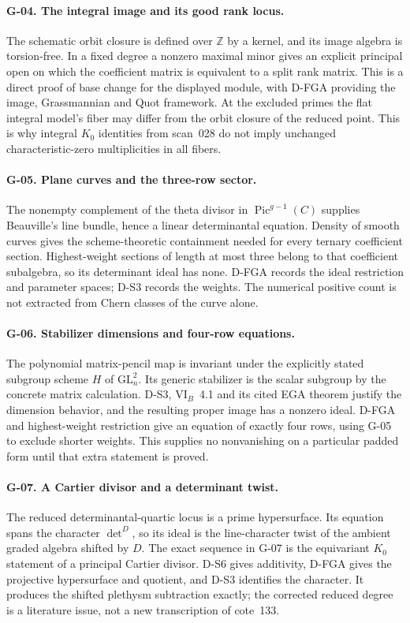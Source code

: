 \paragraph{G-04. The integral image and its good rank locus.}
The schematic orbit closure is defined over $\mathbb Z$ by a kernel, and its image algebra is torsion-free. In a fixed degree a nonzero maximal minor gives an explicit principal open on which the coefficient matrix is equivalent to a split rank matrix. This is a direct proof of base change for the displayed module, with D-FGA providing the image, Grassmannian and Quot framework. At the excluded primes the flat integral model's fiber may differ from the orbit closure of the reduced point. This is why integral $K_0$ identities from scan~028 do not imply unchanged characteristic-zero multiplicities in all fibers.

\paragraph{G-05. Plane curves and the three-row sector.}
The nonempty complement of the theta divisor in $\operatorname{Pic}^{g-1}(C)$ supplies Beauville's line bundle, hence a linear determinantal equation. Density of smooth curves gives the scheme-theoretic containment needed for every ternary coefficient section. Highest-weight sections of length at most three belong to that coefficient subalgebra, so its determinant ideal has none. D-FGA records the ideal restriction and parameter spaces; D-S3 records the weights. The numerical positive count is not extracted from Chern classes of the curve alone.

\paragraph{G-06. Stabilizer dimensions and four-row equations.}
The polynomial matrix-pencil map is invariant under the explicitly stated subgroup scheme $H$ of $\mathrm{GL}_n^2$. Its generic stabilizer is the scalar subgroup by the concrete matrix calculation. D-S3, VI$_B$~4.1 and its cited EGA theorem justify the dimension behavior, and the resulting proper image has a nonzero ideal. D-FGA and highest-weight restriction give an equation of exactly four rows, using G-05 to exclude shorter weights. This supplies no nonvanishing on a particular padded form until that extra statement is proved.

\paragraph{G-07. A Cartier divisor and a determinant twist.}
The reduced determinantal-quartic locus is a prime hypersurface. Its equation spans the character $\det^D$, so its ideal is the line-character twist of the ambient graded algebra shifted by $D$. The exact sequence in G-07 is the equivariant $K_0$ statement of a principal Cartier divisor. D-S6 gives additivity, D-FGA gives the projective hypersurface and quotient, and D-S3 identifies the character. It produces the shifted plethysm subtraction exactly; the corrected reduced degree is a literature issue, not a new transcription of cote~133.

